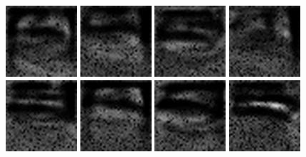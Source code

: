 \documentclass[10pt]{article}
\begin{document}
			\begin{center}
				\includegraphics{stro1.jpg}
				\includegraphics{stro2.jpg}
				\includegraphics{stro3.jpg} 
				\includegraphics{stro4.jpg}
				\includegraphics{stro5.jpg}
				\includegraphics{stro6.jpg}
				\includegraphics{stro7.jpg}
				\includegraphics{stro8.jpg}
			\end{center}
\end{document}

